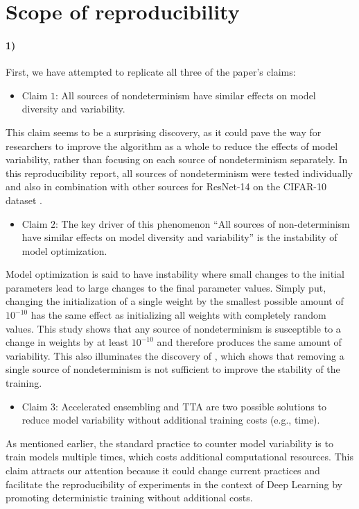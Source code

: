\section{Scope of reproducibility}
\label{sec:Scope}
\paragraph{1)}
 First, we have attempted to replicate all three of the paper's claims: 
\begin{itemize}
\item Claim $1$: All sources of nondeterminism have similar effects on model diversity and variability.
\end{itemize}
 This claim seems to be a surprising discovery, as it could pave the way for researchers to improve the algorithm as a whole to reduce the effects of model variability, rather than focusing on each source of nondeterminism separately. In this reproducibility report, all sources of nondeterminism were tested individually and also in combination with other sources for ResNet-14 \cite{he2016deep} on the CIFAR-10 dataset \cite{krizhevsky2009learning}. \begin{itemize}
 \item Claim $2$: The key driver of this phenomenon ``All sources of non-determinism have similar effects on model diversity and variability'' is the instability of model optimization.
\end{itemize}
Model optimization is said to have instability where small changes to the initial parameters lead to large changes to the final parameter values. Simply put, changing the initialization of a single weight by the smallest possible amount of $10^{-10}$ has the same effect as initializing all weights with completely random values. This study shows that any source of nondeterminism is susceptible to a change in weights by at least $10^{-10}$ and therefore produces the same amount of variability. This also illuminates the discovery of \cite{zhuang2021randomness}, which shows that removing a single source of nondeterminism is not sufficient to improve the stability of the training.
\begin{itemize}
 \item Claim $3$: Accelerated ensembling and TTA are two possible solutions to reduce model variability without additional training costs (e.g., time).
\end{itemize}
As mentioned earlier, the standard practice to counter model variability is to train models multiple times, which costs additional computational resources. This claim attracts our attention because it could change current practices and facilitate the reproducibility of experiments in the context of Deep Learning by promoting deterministic training without additional costs.

